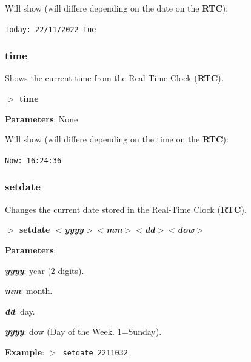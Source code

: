 \documentclass[a4paper,11pt]{article}
\begin{document}
        Will show (will differe depending on the date on the \textbf{RTC}):

        \hspace{1cm}\texttt{Today:\ 22/11/2022 Tue}

        \subsubsection{{\color{blue}time}}
        Shows the current time from the Real-Time Clock (\textbf{RTC}).

        \hspace{1.9cm}\textbf{$>$ time}

        \textbf{Parameters}: None

        Will show (will differe depending on the time on the \textbf{RTC}):

        \hspace{1cm}\texttt{Now:\ 16:24:36}

        \subsubsection{{\color{blue}setdate}}
        Changes the current date stored in the Real-Time Clock (\textbf{RTC}).

        \hspace{1.9cm}\textbf{$>$ setdate \textit{$<$yyyy$>$$<$mm$>$$<$dd$>$$<$dow$>$}}

        \textbf{Parameters}:

        \hspace{1cm}\textbf{\textit{yyyy}}: year (2 digits).

        \hspace{1cm}\textbf{\textit{mm}}: month.

        \hspace{1cm}\textbf{\textit{dd}}: day.

        \hspace{1cm}\textbf{\textit{yyyy}}: dow (Day of the Week. 1=Sunday).

        \textbf{Example}: \texttt{$>$ setdate 2211032}

\end{document}
